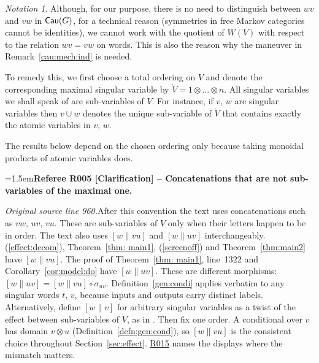 \documentclass[12pt]{amsart}
\newcommand{\RefereeRemark}[4]{%
  \par\medskip\begingroup\normalfont\small\color{RefereePurple}%
  \emergencystretch=1.5em\noindent\textbf{Referee R#1 [#2] -- #3.}\par\nobreak\noindent #4\par
  \endgroup\medskip
}
\theoremstyle{plain}
\theoremstyle{definition}
\theoremstyle{remark}
\newtheorem{nota}[thm]{Notation}
\numberwithin{equation}{section}
\theoremstyle{plain}
\newcommand{\0}{\emptyset}
\newcommand{\cat}[1]{\textup{\textsf{#1}}}
\begin{document}
\begin{nota}
Although, for our purpose, there is no need to distinguish between $wv$ and $vw$ in $\cat{Cau}(G)$, for a technical reason (symmetries in free Markov categories cannot be identities), we cannot work with the quotient of $W(V)$ with respect to the relation $wv=vw$ on words. This is also the reason why the maneuver in Remark~\ref{cau:mech:ind} is needed.

To remedy this, we first choose a total ordering on $V$ and denote the corresponding maximal singular variable by $\dot V = 1 \otimes \ldots \otimes n$. All singular variables we shall speak of are sub-variables of $\dot V$. For instance, if $v$, $w$ are  singular variables then  $v \cup w$  denotes the unique sub-variable of $\dot V$ that contains exactly the atomic variables in $v$, $w$.

The results below depend on the chosen ordering only because taking monoidal products of atomic variables does.
\end{nota}
\hypertarget{review-005}{}\RefereeRemark{005}{Clarification}{Concatenations that are not sub-variables of the maximal one}{%
\textit{Original source line 960.}\quad After this convention the text uses concatenations such as $vw$, $uv$, $vu$. These are sub-variables of $\dot V$ only when their letters happen to be in order. The text also uses $[w \| vu]$ and $[w \| uv]$ interchangeably. (\ref{effect:decom}), Theorem~\ref{thm: main1}, (\ref{screenoff}) and Theorem~\ref{thm:main2} have $[w \| vu]$. The proof of Theorem~\ref{thm: main1}, line~1322 and Corollary~\ref{cor:model:do} have $[w \| uv]$. These are different morphisms: $[w \| uv] = [w \| vu] \circ \sigma_{uv}$. Definition~\ref{gen:condi} applies verbatim to any singular words $t$, $v$, because inputs and outputs carry distinct labels. Alternatively, define $[w \| v]$ for arbitrary singular variables as a twist of the effect between sub-variables of $\dot V$, as in \cite[Definition~6.4]{YinZhangModularity}. Then fix one order. A conditional over $v$ has domain $v \otimes u$ (Definition~\ref{defn:gen:cond}), so $[w \| vu]$ is the consistent choice throughout Section~\ref{sec:effect}. \hyperlink{review-015}{R015} names the displays where the mismatch matters.
}
\end{document}
